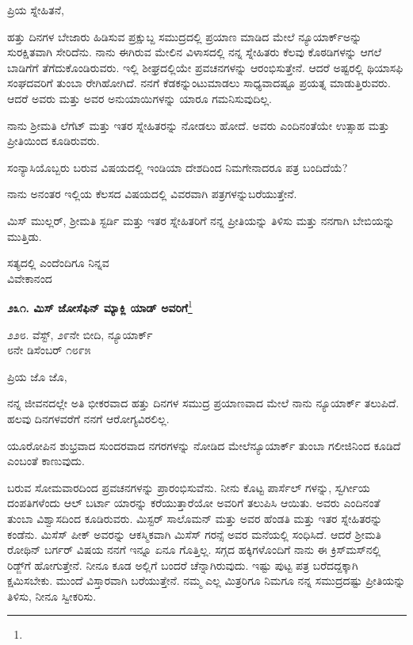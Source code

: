 \noindent
ಪ್ರಿಯ ಸ್ನೇಹಿತನೆ,

ಹತ್ತು ದಿನಗಳ ಬೇಜಾರು ಹಿಡಿಸುವ ಪ್ರಕ್ಷುಬ್ದ ಸಮುದ್ರದಲ್ಲಿ ಪ್ರಯಾಣ ಮಾಡಿದ ಮೇಲೆ ನ್ಯೂಯಾರ್ಕ್‌ಅನ್ನು ಸುರಕ್ಷಿತವಾಗಿ ಸೇರಿದೆನು. ನಾನು ಈಗಿರುವ ಮೇಲಿನ ವಿಳಾಸದಲ್ಲಿ ನನ್ನ ಸ್ನೇಹಿತರು ಕೆಲವು ಕೊಠಡಿಗಳನ್ನು ಆಗಲೆ ಬಾಡಿಗೆಗೆ ತೆಗೆದುಕೊಂಡಿರುವರು. ಇಲ್ಲಿ ಶೀಘ್ರದಲ್ಲಿಯೇ ಪ್ರವಚನಗಳನ್ನು ಆರಂಭಿಸುತ್ತೇನೆ. ಆದರೆ ಅಷ್ಟರಲ್ಲಿ ಥಿಯಾಸಫಿ ಸಂಘದವರಿಗೆ ತುಂಬಾ ರೇಗಿಹೋಗಿದೆ. ನನಗೆ ಕೆಡಕನ್ನುಂಟುಮಾಡಲು ಸಾಧ್ಯವಾದಷ್ಟೂ ಪ್ರಯತ್ನ ಮಾಡುತ್ತಿರುವರು. ಆದರೆ ಅವರು ಮತ್ತು ಅವರ ಅನುಯಾಯಿಗಳನ್ನು ಯಾರೂ ಗಮನಿಸುವುದಿಲ್ಲ.

ನಾನು ಶ‍್ರೀಮತಿ ಲೆಗೆಟ್ ಮತ್ತು ಇತರ ಸ್ನೇಹಿತರನ್ನು ನೋಡಲು ಹೋದೆ. ಅವರು ಎಂದಿನಂತೆಯೇ ಉತ್ಸಾಹ ಮತ್ತು ಪ್ರೀತಿಯಿಂದ ಕೂಡಿರುವರು.

ಸಂನ್ಯಾಸಿಯೊಬ್ಬರು ಬರುವ ವಿಷಯದಲ್ಲಿ ಇಂಡಿಯಾ ದೇಶದಿಂದ ನಿಮಗೇನಾದರೂ ಪತ್ರ ಬಂದಿದೆಯೆ?

ನಾನು ಅನಂತರ ಇಲ್ಲಿಯ ಕೆಲಸದ ವಿಷಯದಲ್ಲಿ ವಿವರವಾಗಿ ಪತ್ರಗಳನ್ನು\break ಬರೆಯುತ್ತೇನೆ.

ಮಿಸ್ ಮುಲ್ಲರ್, ಶ‍್ರೀಮತಿ ಸ್ಟರ್ಡಿ ಮತ್ತು ಇತರ ಸ್ನೇಹಿತರಿಗೆ ನನ್ನ ಪ್ರೀತಿಯನ್ನು ತಿಳಿಸು ಮತ್ತು ನನಗಾಗಿ ಬೇಬಿಯನ್ನು ಮುತ್ತಿಡು.

{\flushright
ಸತ್ಯದಲ್ಲಿ ಎಂದೆಂದಿಗೂ ನಿನ್ನವ\\ವಿವೇಕಾನಂದ\par}

\begin{center}
\textbf{೨೩೧. ಮಿಸ್ ಜೋಸೆಫಿನ್ ಮ್ಯಾಕ್ಲಿ ಯಾಡ್ ಅವರಿಗೆ}\footnote{}
\end{center}

\begin{flushright}
೨೨೮. ವೆಸ್ಟ್, ೨೯ನೇ ಬೀದಿ, ನ್ಯೂಯಾರ್ಕ್\\೮ನೇ ಡಿಸೆಂಬರ್ ೧೮೯೫
\end{flushright}

\noindent
ಪ್ರಿಯ ಜೊ ಜೊ,

ನನ್ನ ಜೀವನದಲ್ಲೇ ಅತಿ ಭೀಕರವಾದ ಹತ್ತು ದಿನಗಳ ಸಮುದ್ರ ಪ್ರಯಾಣವಾದ ಮೇಲೆ ನಾನು ನ್ಯೂಯಾರ್ಕ್ ತಲುಪಿದೆ. ಹಲವು ದಿನಗಳವರೆಗೆ ನನಗೆ ಆರೋಗ್ಯವಿರಲಿಲ್ಲ.

ಯೂರೋಪಿನ ಶುಭ್ರವಾದ ಸುಂದರವಾದ ನಗರಗಳನ್ನು ನೋಡಿದ ಮೇಲೆ\break ನ್ಯೂಯಾರ್ಕ್‌ ತುಂಬಾ ಗಲೀಜಿನಿಂದ ಕೂಡಿದೆ ಎಂಬಂತೆ ಕಾಣುವುದು.

ಬರುವ ಸೋಮವಾರದಿಂದ ಪ್ರವಚನಗಳನ್ನು ಪ್ರಾರಂಭಿಸುವೆನು. ನೀನು ಕೊಟ್ಟ ಪಾರ್ಸೆಲ್ ಗಳನ್ನು, ಸ್ವರ್ಗೀಯ ದಂಪತಿಗಳೆಂದು ಆಲ್ ಬರ್ಟಾ ಯಾರನ್ನು ಕರೆಯುತ್ತಾರೆಯೋ ಅವರಿಗೆ ತಲುಪಿಸಿ ಆಯಿತು. ಅವರು ಎಂದಿನಂತೆ ತುಂಬಾ ವಿಶ್ವಾಸದಿಂದ ಕೂಡಿರುವರು. ಮಿಸ್ಟರ್‌ ಸಾಲೊಮನ್ ಮತ್ತು ಅವರ ಹೆಂಡತಿ ಮತ್ತು ಇತರ ಸ್ನೇಹಿತರನ್ನು ಕಂಡೆನು. ಮಿಸೆಸ್ ಪೀಕ್ ಅವರನ್ನು ಆಕಸ್ಮಿಕವಾಗಿ ಮಿಸೆಸ್ ಗರನ್ಸೆ ಅವರ ಮನೆಯಲ್ಲಿ ಸಂಧಿಸಿದೆ. ಆದರೆ ಶ‍್ರೀಮತಿ ರೋಥಿನ್ ಬರ್ಗರ್ ವಿಷಯ ನನಗೆ ಇನ್ನೂ ಏನೂ ಗೊತ್ತಿಲ್ಲ. ಸಗ್ಗದ ಹಕ್ಕಿಗಳೊಂದಿಗೆ ನಾನು ಈ ಕ್ರಿಸ್‌ಮಸ್‌ನಲ್ಲಿ ರಿಡ್ಜ್‌ಗೆ ಹೋಗುತ್ತೇನೆ. ನೀನೂ ಕೂಡ ಅಲ್ಲಿಗೆ ಬಂದರೆ ಚೆನ್ನಾಗಿರುವುದು. ಇಷ್ಟು ಪುಟ್ಟ ಪತ್ರ ಬರೆದದ್ದಕ್ಕಾಗಿ ಕ್ಷಮಿಸಬೇಕು. ಮುಂದೆ ವಿಸ್ತಾರವಾಗಿ ಬರೆಯುತ್ತೇನೆ. ನಮ್ಮ ಎಲ್ಲ ಮಿತ್ರರಿಗೂ ನಿಮಗೂ ನನ್ನ ಸಮುದ್ರದಷ್ಟು ಪ್ರೀತಿಯನ್ನು ತಿಳಿಸು, ನೀನೂ ಸ್ವೀಕರಿಸು.


